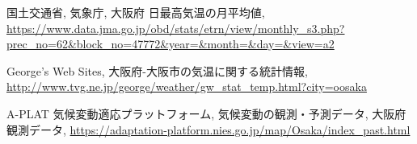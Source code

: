 \documentclass[a4j,fleqn,dvipdfmx,uplatex]{jsarticle}
\begin{document}
\begin{thebibliography}{99}
国土交通省, 気象庁, 大阪府 日最高気温の月平均値, 
\url{https://www.data.jma.go.jp/obd/stats/etrn/view/monthly_s3.php?prec_no=62&block_no=47772&year=&month=&day=&view=a2}\vspace{2mm}

George's Web Sites, 大阪府-大阪市の気温に関する統計情報, 
\url{http://www.tvg.ne.jp/george/weather/gw_stat_temp.html?city=oosaka}\vspace{2mm}

A-PLAT 気候変動適応プラットフォーム, 気候変動の観測・予測データ, 大阪府観測データ, 
\url{https://adaptation-platform.nies.go.jp/map/Osaka/index_past.html}\vspace{2mm}
\end{thebibliography}
%
%
%
\end{document}

